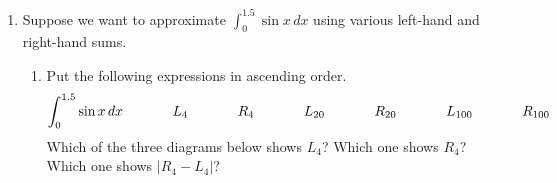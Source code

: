 \documentclass[main]{subfiles}
\begin{document}
\begin{enumerate}[resume]
\begin{enumerate}
  \end{enumerate}
    \pspace{\newpage}
    
\item {

  Suppose we want to approximate $\displaystyle
  \int_0^{1.5} \sin x \,dx$ using various left-hand and right-hand sums.

  \begin{enumerate}
  \item 
      Put the following expressions in ascending order.
      \[ 
      \int_0^{1.5} \sin x \,dx \hspace{0.5in} L_4 \hspace{0.5in} R_4
      \hspace{0.5in} L_{20} \hspace{0.5in} R_{20} \hspace{0.5in} L_{100}
      \hspace{0.5in} R_{100}
      \]
      \pspace{16pt}
      Which of the three diagrams below shows $L_4$? Which one
      shows $R_4$? Which one shows $|R_4 - L_4|$?
    

\end{enumerate}}
\end{enumerate}
\end{document}
